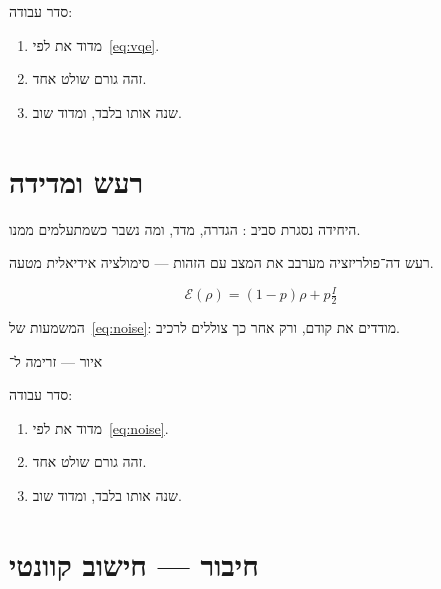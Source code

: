 סדר עבודה:
\begin{enumerate}
\item[(\textbf{א})] מדוד את  לפי~\eqref{eq:vqe}.
\item[(\textbf{ב})] זהה גורם שולט אחד.
\item[(\textbf{ג})] שנה אותו בלבד, ומדוד שוב.
\end{enumerate}

\chapter{רעש ומדידה}
\label{ch:noise}

היחידה נסגרת סביב : הגדרה, מדד, ומה נשבר כשמתעלמים ממנו.

\begin{warnbox}[frametitle={מלכודת — רעש ומדידה}]
רעש דה־פולריזציה מערבב את המצב עם הזהות — סימולציה אידיאלית מטעה.
\end{warnbox}

\begin{equation}
\label{eq:noise}
\mathcal{E}(\rho)=(1-p)\rho+p\tfrac{I}{2}
\end{equation}

המשמעות של~\eqref{eq:noise}: מודדים את  קודם, ורק אחר כך צוללים לרכיב.

\begin{tikzpic}
\end{tikzpic}
\begin{center}\small איור — זרימה ל־\end{center}

סדר עבודה:
\begin{enumerate}
\item[(\textbf{א})] מדוד את  לפי~\eqref{eq:noise}.
\item[(\textbf{ב})] זהה גורם שולט אחד.
\item[(\textbf{ג})] שנה אותו בלבד, ומדוד שוב.
\end{enumerate}


\chapter{חיבור — חישוב קוונטי}
\label{ch:bridge-qubit}

